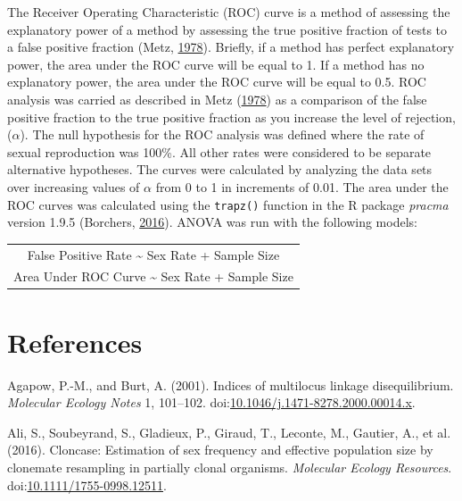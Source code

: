 \documentclass[double,12pt]{beavtex}
\begin{document}
  The Receiver Operating Characteristic (ROC) curve is a method of
  assessing the explanatory power of a method by assessing the true
  positive fraction of tests to a false positive fraction (Metz,
  \protect\hyperlink{ref-metz1978basic}{1978}). Briefly, if a method has
  perfect explanatory power, the area under the ROC curve will be equal to
  1. If a method has no explanatory power, the area under the ROC curve
  will be equal to 0.5. ROC analysis was carried as described in Metz
  (\protect\hyperlink{ref-metz1978basic}{1978}) as a comparison of the
  false positive fraction to the true positive fraction as you increase
  the level of rejection, (\(\alpha\)). The null hypothesis for the ROC
  analysis was defined where the rate of sexual reproduction was 100\%.
  All other rates were considered to be separate alternative hypotheses.
  The curves were calculated by analyzing the data sets over increasing
  values of \(\alpha\) from 0 to 1 in increments of 0.01. The area under
  the ROC curves was calculated using the \texttt{trapz()} function in the
  R package \emph{pracma} version 1.9.5 (Borchers,
  \protect\hyperlink{ref-borchers2016pracma}{2016}). ANOVA was run with
  the following models:
  
  \begin{longtable}[c]{@{}c@{}}
  \toprule
  False Positive Rate \textasciitilde{} Sex Rate + Sample
  Size\tabularnewline
  Area Under ROC Curve \textasciitilde{} Sex Rate + Sample
  Size\tabularnewline
  \bottomrule
  \end{longtable}
  
  \backmatter
  
  \chapter{References}\label{references}
  
  \noindent
  
  \setlength{\parindent}{-0.20in} \setlength{\leftskip}{0.20in}
  \setlength{\parskip}{8pt}
  
  \hypertarget{refs}{}
  \hypertarget{ref-Agapowux5f2001}{}
  Agapow, P.-M., and Burt, A. (2001). Indices of multilocus linkage
  disequilibrium. \emph{Molecular Ecology Notes} 1, 101--102.
  doi:\href{https://doi.org/10.1046/j.1471-8278.2000.00014.x}{10.1046/j.1471-8278.2000.00014.x}.
  
  \hypertarget{ref-ali2016cloncase}{}
  Ali, S., Soubeyrand, S., Gladieux, P., Giraud, T., Leconte, M., Gautier,
  A., et al. (2016). Cloncase: Estimation of sex frequency and effective
  population size by clonemate resampling in partially clonal organisms.
  \emph{Molecular Ecology Resources}.
  doi:\href{https://doi.org/10.1111/1755-0998.12511}{10.1111/1755-0998.12511}.
  
\end{document}
